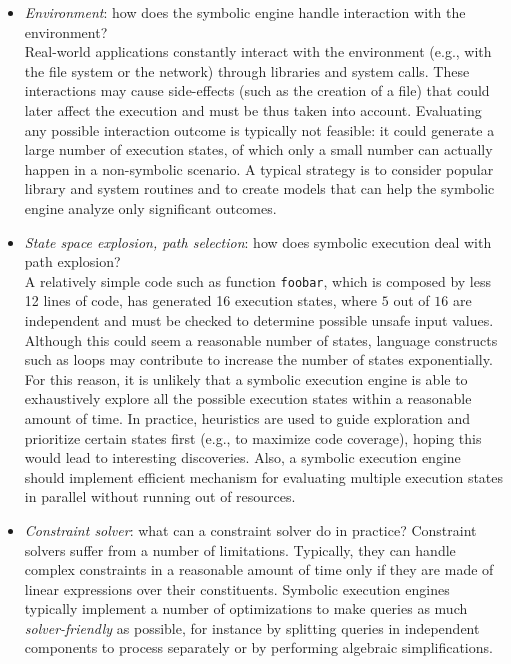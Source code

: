 \begin{itemize}
  \item {\em Environment}: how does the symbolic engine handle interaction with the environment? \\
  Real-world applications constantly interact with the environment (e.g., with the file system or the network) through libraries and system calls. These interactions may cause side-effects
(such as the creation of a file) that could later affect the execution and must be thus taken into account. Evaluating any possible interaction outcome is typically not feasible: it could generate a large number of execution states, of which only a small number can actually happen in a non-symbolic scenario. A typical strategy is to consider popular library and system routines and to create models that can help the symbolic engine analyze only significant outcomes.
\vspace{1mm}

  \item {\em State space explosion, path selection}: how does symbolic execution deal with path explosion? \\
  A relatively simple code such as function {\tt foobar}, which is composed by less 12 lines of code, has generated 16 execution states, where $5$ out of $16$ are independent and must be checked to determine possible unsafe input values. Although this could seem a reasonable number of states, language constructs such as loops may contribute to increase the number of states exponentially. For this reason, it is unlikely that a symbolic execution engine is able to exhaustively explore all the possible execution states within a reasonable amount of time. In practice, heuristics are used to guide exploration and prioritize certain states first (e.g., to maximize code coverage), hoping this would lead to interesting discoveries. Also, a symbolic execution engine should implement efficient mechanism for evaluating multiple execution states in parallel without running out of resources.
\vspace{1mm}

  \item {\em Constraint solver}: what can a constraint solver do in practice?
 Constraint solvers suffer from a number of limitations. Typically, they can handle complex constraints in a reasonable amount of time only if they are made of linear expressions over their constituents. Symbolic execution engines typically implement a number of optimizations to make queries as much {\em solver-friendly} as possible, for instance by splitting queries in independent components to process separately or by performing algebraic simplifications.
\vspace{1mm}


\end{itemize}
